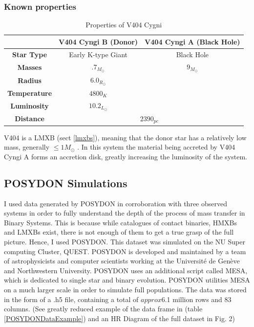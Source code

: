 \documentclass[12pt, letterpaper]{article}
\begin{document}
        \subsubsection{Known properties}
        \begin{table}
            \begin{center} 
                \begin{tabular}{||c | c c||} 
                 \hline
                 & \textbf{V404 Cyngi B (Donor)} & \textbf{V404 Cyngi A (Black Hole)} \\ 
                 \hline\hline
                 \textbf{Star Type} & Early K-type Giant & Black Hole \\ 
                 \hline
                 \textbf{Masses}& $.7_{M_\odot}$ \cite{Bernardini_2016} & $9_{M_\odot}$ \cite{Shahbaz_1994} \\
                 \hline
                 \textbf{Radius} & $6.0_{R_\odot}$ \cite{Shahbaz_1994} &  \\
                 \hline
                 \textbf{Temperature} & $4800_K$ \cite{Shahbaz_1994} & \\
                 \hline
                 \textbf{Luminosity} & $10.2_{L_\odot}$ \cite{Shahbaz_1994} &  \\ 
                 \hline
                 \textbf{Distance} & \multicolumn{2}{c||}{$2390_{pc}$ \cite{Bernardini_2016}} \\
                 \hline
            \end{tabular}
            \caption{Properties of V404 Cygni} 
            \label{V404Data} 
            \end{center}
        \end{table}

        V404 is a LMXB (sect \ref{lmxbs}), meaning that the donor star has a relatively low mass, generally $\leq 1 M_\odot$ \cite{Bahramian_2023}. In this system the material being accreted by V404 Cyngi A forms an accretion disk, greatly increasing the luminosity of the system.

    \subsection{POSYDON Simulations}
         I used data generated by POSYDON \cite{Fragos_2023} in corroboration with three observed systems in order to fully understand the depth of the process of mass transfer in Binary Systems. This is because while catalogues of contact binaries, HMXBs and LMXBs exist, there is not enough of them to get a true grasp of the full picture. Hence, I used POSYDON. This dataset was simulated on the NU Super computing Cluster, QUEST. POSYDON is developed and maintained by a team of astrophysicists and computer scientists working at the Université de Genève and Northwestern University. POSYDON uses an additional script called MESA, which is dedicated to single star and binary evolution. POSYDON utilities MESA on a much larger scale in order to simulate full populations. The data was stored in the form of a .h5 file, containing a total of $approx$6.1 million rows and 83 columns. (See greatly reduced example of the data frame in (table \ref{POSYDONDataExample}) and an HR Diagram of the full dataset in Fig. 2)
\end{document}
